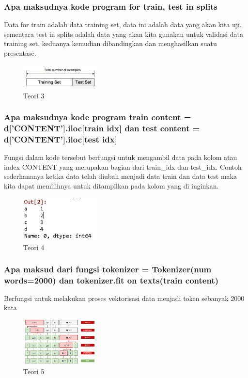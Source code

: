 \subsubsection{Apa maksudnya kode program for train, test in splits}
\hfill\break
Data for train adalah data training set, data ini adalah data yang akan kita uji, sementara test in splits adalah data yang akan kita gunakan untuk validasi data training set, keduanya kemudian dibandingkan dan menghasilkan suatu presentase.
\begin{figure}[H]
\centering
	\includegraphics[width=4cm]{figures/1174079/7/trainingset.png}
\caption{Teori 3}
\end{figure}

\subsubsection{Apa maksudnya kode program train content = d[’CONTENT’].iloc[train idx] dan test content = d[’CONTENT’].iloc[test idx]}
\hfill\break
Fungsi dalam kode tersebut berfungsi untuk mengambil data pada kolom atau index CONTENT yang merupakan bagian dari train\_idx dan test\_idx. Contoh sederhananya ketika data telah diubah menjadi data train dan data test maka kita dapat memilihnya untuk ditampilkan pada kolom yang di inginkan. 

\begin{figure}[H]
\centering
	\includegraphics[width=4cm]{figures/1174079/7/nomor3.PNG}
\caption{Teori 4}
\end{figure}

\subsubsection{Apa maksud dari fungsi tokenizer = Tokenizer(num words=2000) dan tokenizer.fit on texts(train content)}
\hfill\break
Berfungsi untuk melakukan proses vektorisasi data menjadi token sebanyak 2000 kata
\begin{figure}[H]
\centering
	\includegraphics[width=4cm]{figures/1174079/7/fungsitokenizer.png}
\caption{Teori 5}
\end{figure}

